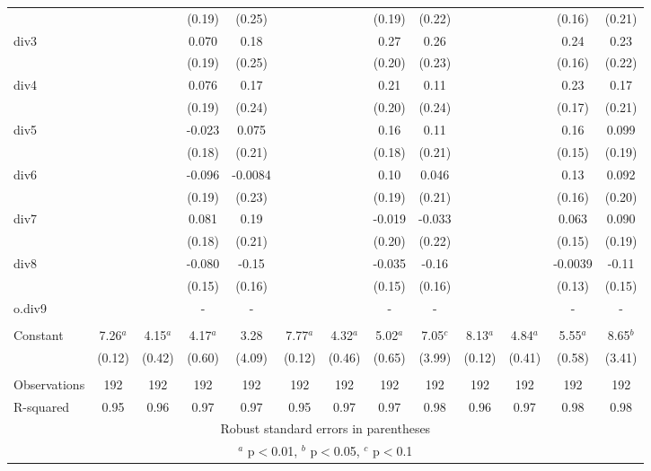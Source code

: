 \documentclass[]{article}
\begin{document}
\begin{tabular}{lcccccccccccc}
 &  &  & (0.19) & (0.25) &  &  & (0.19) & (0.22) &  &  & (0.16) & (0.21) \\
div3 &  &  & 0.070 & 0.18 &  &  & 0.27 & 0.26 &  &  & 0.24 & 0.23 \\
 &  &  & (0.19) & (0.25) &  &  & (0.20) & (0.23) &  &  & (0.16) & (0.22) \\
div4 &  &  & 0.076 & 0.17 &  &  & 0.21 & 0.11 &  &  & 0.23 & 0.17 \\
 &  &  & (0.19) & (0.24) &  &  & (0.20) & (0.24) &  &  & (0.17) & (0.21) \\
div5 &  &  & -0.023 & 0.075 &  &  & 0.16 & 0.11 &  &  & 0.16 & 0.099 \\
 &  &  & (0.18) & (0.21) &  &  & (0.18) & (0.21) &  &  & (0.15) & (0.19) \\
div6 &  &  & -0.096 & -0.0084 &  &  & 0.10 & 0.046 &  &  & 0.13 & 0.092 \\
 &  &  & (0.19) & (0.23) &  &  & (0.19) & (0.21) &  &  & (0.16) & (0.20) \\
div7 &  &  & 0.081 & 0.19 &  &  & -0.019 & -0.033 &  &  & 0.063 & 0.090 \\
 &  &  & (0.18) & (0.21) &  &  & (0.20) & (0.22) &  &  & (0.15) & (0.19) \\
div8 &  &  & -0.080 & -0.15 &  &  & -0.035 & -0.16 &  &  & -0.0039 & -0.11 \\
 &  &  & (0.15) & (0.16) &  &  & (0.15) & (0.16) &  &  & (0.13) & (0.15) \\
o.div9 &  &  & - & - &  &  & - & - &  &  & - & - \\
 &  &  &  &  &  &  &  &  &  &  &  &  \\
Constant & 7.26$^a$ & 4.15$^a$ & 4.17$^a$ & 3.28 & 7.77$^a$ & 4.32$^a$ & 5.02$^a$ & 7.05$^c$ & 8.13$^a$ & 4.84$^a$ & 5.55$^a$ & 8.65$^b$ \\
 & (0.12) & (0.42) & (0.60) & (4.09) & (0.12) & (0.46) & (0.65) & (3.99) & (0.12) & (0.41) & (0.58) & (3.41) \\
 &  &  &  &  &  &  &  &  &  &  &  &  \\
Observations & 192 & 192 & 192 & 192 & 192 & 192 & 192 & 192 & 192 & 192 & 192 & 192 \\
 R-squared & 0.95 & 0.96 & 0.97 & 0.97 & 0.95 & 0.97 & 0.97 & 0.98 & 0.96 & 0.97 & 0.98 & 0.98 \\ \hline
\multicolumn{13}{c}{ Robust standard errors in parentheses} \\
\multicolumn{13}{c}{ $^a$ p$<$0.01, $^b$ p$<$0.05, $^c$ p$<$0.1} \\
\end{tabular}
\end{document}
